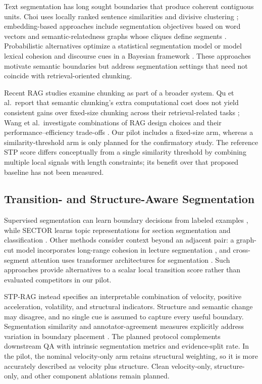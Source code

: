 \documentclass[10pt]{article}
\begin{document}
Text segmentation has long sought boundaries that produce coherent contiguous units. Choi uses locally ranked sentence similarities and divisive clustering \cite{Choi2000AdvancesDomain}; embedding-based approaches include segmentation objectives based on word vectors \cite{Alemi2015TextSegmentation} and semantic-relatedness graphs whose cliques define segments \cite{Glavas2016UnsupervisedText}. Probabilistic alternatives optimize a statistical segmentation model \cite{Utiyama2001StatisticalModel} or model lexical cohesion and discourse cues in a Bayesian framework \cite{Eisenstein2008BayesianUnsupervised}. These approaches motivate semantic boundaries but address segmentation settings that need not coincide with retrieval-oriented chunking.

Recent RAG studies examine chunking as part of a broader system. Qu et al.\ report that semantic chunking's extra computational cost does not yield consistent gains over fixed-size chunking across their retrieval-related tasks \cite{Qu2024SemanticChunking}; Wang et al.\ investigate combinations of RAG design choices and their performance--efficiency trade-offs \cite{Wang2024SearchingBest}. Our pilot includes a fixed-size arm, whereas a similarity-threshold arm is only planned for the confirmatory study. The reference STP score differs conceptually from a single similarity threshold by combining multiple local signals with length constraints; its benefit over that proposed baseline has not been measured.

\subsection{Transition- and Structure-Aware Segmentation}

Supervised segmentation can learn boundary decisions from labeled examples \cite{Koshorek2018TextSegmentation}, while SECTOR learns topic representations for section segmentation and classification \cite{Arnold2019SectorNeural}. Other methods consider context beyond an adjacent pair: a graph-cut model incorporates long-range cohesion in lecture segmentation \cite{Malioutov2006MinimumCut}, and cross-segment attention uses transformer architectures for segmentation \cite{Lukasik2020TextSegmentation}. Such approaches provide alternatives to a scalar local transition score rather than evaluated competitors in our pilot.

STP-RAG instead specifies an interpretable combination of velocity, positive acceleration, volatility, and structural indicators. Structure and semantic change may disagree, and no single cue is assumed to capture every useful boundary. Segmentation similarity and annotator-agreement measures explicitly address variation in boundary placement \cite{Fournier2012SegmentationSimilarity}. The planned protocol complements downstream QA with intrinsic segmentation metrics and evidence-split rate. In the pilot, the nominal velocity-only arm retains structural weighting, so it is more accurately described as velocity plus structure. Clean velocity-only, structure-only, and other component ablations remain planned.
\end{document}
